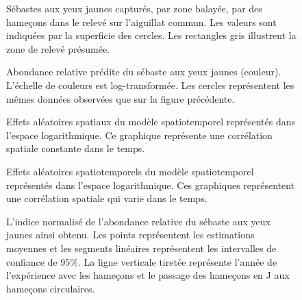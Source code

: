 \documentclass[11pt]{book}
\begin{document}
\clearpage
\begin{figure}[htb]

{\centering {} 

}

\caption{Sébastes aux yeux jaunes capturés, par zone balayée, par des hameçons dans le relevé sur l’aiguillat commun. Les valeurs sont indiquées par la superficie des cercles. Les rectangles gris illustrent la zone de relevé présumée.}\label{fig:dog-raw}
\end{figure}
\begin{figure}[htb]

{\centering {} 

}

\caption{Abondance relative prédite du sébaste aux yeux jaunes (couleur). L’échelle de couleurs est log-transformée. Les cercles représentent les mêmes données observées que sur la figure précédente.}\label{fig:dog-prediction}
\end{figure}
\begin{figure}[htb]

{\centering {} 

}

\caption{Effets aléatoires spatiaux du modèle spatiotemporel représentés dans l’espace logarithmique. Ce graphique représente une corrélation spatiale constante dans le temps.}\label{fig:dog-spatial}
\end{figure}
\begin{figure}[htb]

{\centering {} 

}

\caption{Effets aléatoires spatiotemporels du modèle spatiotemporel représentés dans l’espace logarithmique. Ces graphiques représentent une corrélation spatiale qui varie dans le temps.}\label{fig:dog-spatiotemporal}
\end{figure}
\begin{figure}[htb]

{\centering {} 

}

\caption{L’indice normalisé de l’abondance relative du sébaste aux yeux jaunes ainsi obtenu. Les points représentent les estimations moyennes et les segments linéaires représentent les intervalles de confiance de 95\%. La ligne verticale tiretée représente l’année de l’expérience avec les hameçons et le passage des hameçons en J aux hameçons circulaires.}\label{fig:dog-standardized-index}
\end{figure}
\clearpage
\end{document}
